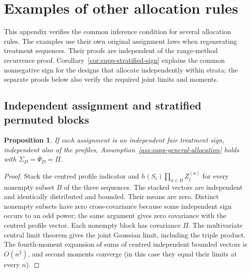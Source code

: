 \documentclass[12pt,a4paper]{article}
\newtheorem{proposition}{Proposition}
\theoremstyle{definition}
\theoremstyle{remark}\newtheorem{remark}{Remark}
\numberwithin{equation}{section}
\begin{document}
\section{Examples of other allocation rules}\label{sec:supp-other-designs}
This appendix verifies the common inference condition for several allocation rules. The examples use their own original assignment laws when regenerating treatment sequences. Their proofs are independent of the range-method recurrence proof. Corollary~\ref{cor:supp-stratified-sign} explains the common nonnegative sign for the designs that allocate independently within strata; the separate proofs below also verify the required joint limits and moments.

\subsection{Independent assignment and stratified permuted blocks}\label{sec:supp-independent}\label{sec:supp-block-extension}
\begin{proposition}\label{prop:supp-independent}
If each assignment is an independent fair treatment sign, independent also of the profiles, Assumption~\ref{ass:supp-general-allocation} holds with $\Sigma_D=\Psi_D=\Pi$.
\end{proposition}
\begin{proof}
Stack the centred profile indicator and $h(S_i)\prod_{a\in B}Z_i^{(a)}$ for every nonempty subset $B$ of the three sequences. The stacked vectors are independent and identically distributed and bounded. Their means are zero. Distinct nonempty subsets have zero cross-covariance because some independent sign occurs to an odd power; the same argument gives zero covariance with the centred profile vector. Each nonempty block has covariance $\Pi$. The multivariate central limit theorem gives the joint Gaussian limit, including the triple product. The fourth-moment expansion of sums of centred independent bounded vectors is $O(n^2)$, and second moments converge (in this case they equal their limits at every $n$).
\end{proof}
\end{document}
